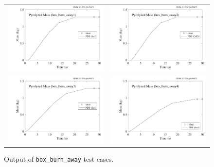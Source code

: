 \documentclass[11pt]{book}
\newcommand{\ct}{\tt\small}
\begin{document}
\begin{figure}[ht]
\begin{tabular*}{\textwidth}{lr}
\includegraphics[width=3.2in]{SCRIPT_FIGURES/box_burn_away1} &
\includegraphics[width=3.2in]{SCRIPT_FIGURES/box_burn_away2} \\
\includegraphics[width=3.2in]{SCRIPT_FIGURES/box_burn_away3} &
\includegraphics[width=3.2in]{SCRIPT_FIGURES/box_burn_away4}
\end{tabular*}
\caption[Output of {\ct box\_burn\_away} test cases.]{Output of {\ct box\_burn\_away} test cases.}
\label{box_burn_away}
\end{figure}
\end{document}
